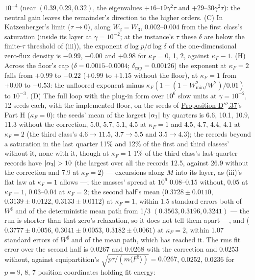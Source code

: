 \begin{sloppypar}
$10^{-4}$ (near $(0.39, 0.29, 0.32)$, the eigenvalues $+16$--$19\gamma^2\tau$ and $+29$--$30\gamma^2\tau$): the neutral
gain leaves the remainder's direction to the higher orders. (C) In Katzenberger's limit ($\tau\to0$), along
$W_2 = W_3$, 0.002--0.004 from the first class's saturation (inside its layer at $\gamma = 10^{-2}$; at the instance's
$\tau$ these $\delta$ are below the finite-$\tau$ threshold of (iii)), the exponent $\dd\log p/\dd\log\delta$ of the
one-dimensional zero-flux density is $-0.99$, $-0.00$ and $+0.98$ for $\kappa_F = 0$, 1, 2, against $\kappa_F - 1$.
(H) Across the floor's cap ($\delta = 0.0015$--$0.0004$; $\delta_{\mathrm{cap}} = 0.00126$) the exponent at
$\kappa_F = 2$ falls from $+0.99$ to $-0.22$ ($+0.99$ to $+1.15$ without the floor), at $\kappa_F = 1$ from $+0.00$ to
$-0.53$: the unfloored exponent minus $\kappa_F(1 - (1 - W_{\min}^2/W^2)/0.01)$ to $10^{-3}$. (D) The full loop with
the plug-in form over $10^6$ slow units at $\gamma = 10^{-2}$, 12 seeds each, with the implemented floor, on the seeds
of \hyperref[res:thmDppp:37]{Proposition D$'''$.37}'s Part H ($\kappa_F = 0$): the seeds' mean of the largest
$\lvert \alpha_1\rvert$ by quarters is 6.6, 10.1, 10.9, 11.3 without the correction, 5.0, 5.7, 5.1, 4.5 at $\kappa_F = 1$ and
4.5, 4.7, 4.4, 4.1 at $\kappa_F = 2$ (the third class's $4.6\to11.5$, $3.7\to5.5$ and $3.5\to4.3$); the records beyond
a saturation in the last quarter 11\% and 12\% of the first and third classes' without it, none with it, though at
$\kappa_F = 1$ 1\% of the third class's last-quarter records have $\lvert \alpha_3\rvert > 10$ (the largest over all the
records 12.5, against 26.9 without the correction and 7.9 at $\kappa_F = 2$) --- excursions along $M$ into its layer,
as (iii)'s flat law at $\kappa_F = 1$ allows ---; the masses' spread at $10^6$ 0.08--0.15 without, 0.05 at
$\kappa_F = 1$, 0.03--0.04 at $\kappa_F = 2$; the second half's mean ($0.3728\pm0.0110$, $0.3139\pm0.0122$,
$0.3133\pm0.0112$) at $\kappa_F = 1$, within 1.5 standard errors both of $W^\sharp$ and of the deterministic mean path
from 1/3 $(0.3563, 0.3196, 0.3241)$ --- the run is shorter than that zero's relaxation, so it does not tell them apart
---, and ($0.3777\pm0.0056$, $0.3041\pm0.0053$, $0.3182\pm0.0061$) at $\kappa_F = 2$, within 1.07 standard errors of
$W^\sharp$ and of the mean path, which has reached it. The rms fit error over the second half is 0.0267 and 0.0268 with
the correction and 0.0253 without, against equipartition's $\sqrt{p\tau/(m\langle F^2\rangle)} = 0.0267$, 0.0252,
0.0236 for $p = 9$, 8, 7 position coordinates holding fit energy:

\end{sloppypar}
